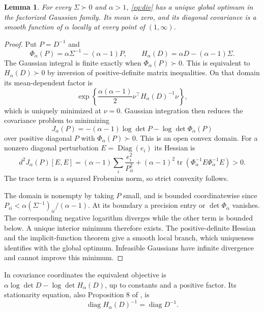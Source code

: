 \documentclass[11pt]{article}
\newtheorem{lemma}[theorem]{Lemma}
\theoremstyle{remark}\newtheorem{remark}[theorem]{Remark}
\newcommand{\diag}{\operatorname{diag}}
\newcommand{\Diag}{\operatorname{Diag}}
\begin{document}
\begin{lemma}\label{lem:global}
For every $\Sigma\succ0$ and $\alpha>1$, \eqref{eq:div} has a unique
global optimum in the factorized Gaussian family. Its mean is zero,
and its diagonal covariance is a smooth function of $\alpha$ locally
at every point of $(1,\infty)$.
\end{lemma}
\begin{proof}
Put $P=D^{-1}$ and
\[
 \Phi_\alpha(P)=\alpha\Sigma^{-1}-(\alpha-1)P,\qquad
 H_\alpha(D)=\alpha D-(\alpha-1)\Sigma.
\]
The Gaussian integral is finite exactly when $\Phi_\alpha(P)\succ0$.
This is equivalent to $H_\alpha(D)\succ0$ by inversion of
positive-definite matrix inequalities. On that domain its
mean-dependent factor is
\[
 \exp\!\left\{\frac{\alpha(\alpha-1)}2
          \nu^\top H_\alpha(D)^{-1}\nu\right\},
\]
which is uniquely minimized at $\nu=0$. Gaussian integration then
reduces the covariance problem to minimizing
\begin{equation}\label{eq:J}
 J_\alpha(P)=-(\alpha-1)\log\det P-\log\det\Phi_\alpha(P)
\end{equation}
over positive diagonal $P$ with $\Phi_\alpha(P)\succ0$.
This is an open convex domain. For a nonzero diagonal perturbation
$E=\Diag(e_i)$ its Hessian is
\[
 d^2J_\alpha(P)[E,E]
 =(\alpha-1)\sum_i\frac{e_i^2}{P_{ii}^2}
  +(\alpha-1)^2\operatorname{tr}
       (\Phi_\alpha^{-1}E\Phi_\alpha^{-1}E)>0.
\]
The trace term is a squared Frobenius norm, so strict convexity follows.

The domain is nonempty by taking $P$ small, and is bounded
coordinatewise since
$P_{ii}<\alpha(\Sigma^{-1})_{ii}/(\alpha-1)$.
At its boundary a precision entry or $\det\Phi_\alpha$ vanishes.
The corresponding negative logarithm diverges while the other term
is bounded below. A unique interior minimum therefore exists.
The positive-definite Hessian and the implicit-function theorem give
a smooth local branch, which uniqueness identifies with the global
optimum. Infeasible Gaussians have infinite divergence and cannot
improve this minimum.
\end{proof}

In covariance coordinates the equivalent objective is
$\alpha\log\det D-\log\det H_\alpha(D)$, up to constants and a positive
factor. Its stationarity equation, also Proposition 8 of \cite{mps}, is
\begin{equation}\label{eq:station}
 \diag H_\alpha(D)^{-1}=\diag D^{-1}.
\end{equation}
\end{document}
